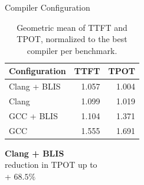 \documentclass[aspectratio=169, handout]{beamer}
\begin{document}
\begin{frame}{Compiler Configuration}
    \begin{minipage}{0.55\textwidth}
        \vspace{4ex}
        \begin{table}[H]
            \centering
            \begin{tabular}{|l|r|r|}
                \hline
                \textbf{Configuration} & \textbf{TTFT} & \textbf{TPOT} \\ \hline
                Clang + BLIS           &         1.057 &         1.004 \\ \hline
                Clang                  &         1.099 &         1.019 \\ \hline
                GCC + BLIS             &         1.104 &         1.371 \\ \hline
                GCC                    &         1.555 &         1.691 \\ \hline
            \end{tabular}
            \caption{
                \onehalfspacing
                Geometric mean of TTFT and TPOT, normalized to the best compiler per benchmark.
            }
            \label{compiler-geomean}
        \end{table}
    \end{minipage}
    \begin{minipage}{0.4\textwidth}
        \vspace{-2ex}
        \centering
        \large
        \textbf{Clang + BLIS}\\
        \vspace{1ex}
        \normalsize \color{black} reduction in TPOT up to \\
        \vspace{1ex}
        \color{ForestGreen}\Huge + $68.5\%$\\
    \end{minipage}
\end{frame}
\end{document}
